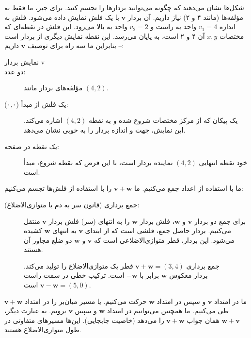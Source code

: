 \documentclass[12pt, a4paper]{book}
\begin{document}
	شکل‌ها نشان می‌دهند که چگونه می‌توانید بردارها را تجسم کنید. برای جبر، ما فقط به مؤلفه‌ها (مانند ۴ و ۲) نیاز داریم. آن بردار $\mathbf{v}$ با یک فلش نمایش داده می‌شود. فلش به اندازه $v_1 = 4$ واحد به راست و $v_2 = 2$ واحد به بالا می‌رود. این فلش در نقطه‌ای که مختصات $x, y$ آن ۴ و ۲ است، به پایان می‌رسد. این نقطه نمایش دیگری از بردار است -- بنابراین ما سه راه برای توصیف $\mathbf{v}$ داریم:
	\begin{description}
		\item[نمایش بردار v]
		\item[دو عدد:] مؤلفه‌های بردار مانند $(4,2)$.
		\item[یک فلش از مبدأ (۰,۰):] یک پیکان که از مرکز مختصات شروع شده و به نقطه $(4,2)$ اشاره می‌کند. این نمایش، جهت و اندازه بردار را به خوبی نشان می‌دهد.
		\item[یک نقطه در صفحه:] خود نقطه انتهایی $(4,2)$ نماینده بردار است، با این فرض که نقطه شروع، مبدأ است.
	\end{description}
	ما با استفاده از اعداد جمع می‌کنیم. ما $\mathbf{v} + \mathbf{w}$ را با استفاده از فلش‌ها تجسم می‌کنیم:
	\begin{description}
		\item[جمع برداری (قانون سر به دم یا متوازی‌الاضلاع):] برای جمع دو بردار $\mathbf{v}$ و $\mathbf{w}$، فلش بردار $\mathbf{w}$ را به انتهای (سر) فلش بردار $\mathbf{v}$ منتقل می‌کنیم. بردار حاصل جمع، فلشی است که از ابتدای $\mathbf{v}$ به انتهای $\mathbf{w}$ کشیده می‌شود. این بردار، قطر متوازی‌الاضلاعی است که $\mathbf{v}$ و $\mathbf{w}$ دو ضلع مجاور آن هستند.
	\end{description}
	
	\begin{figure}[h!]
		\centering
		\caption{جمع برداری $\mathbf{v} + \mathbf{w} = (3, 4)$ قطر یک متوازی‌الاضلاع را تولید می‌کند. بردار معکوس $\mathbf{w}$ برابر با $-\mathbf{w}$ است. ترکیب خطی در سمت راست $\mathbf{v} - \mathbf{w} = (5, 0)$ است.}
	\end{figure}
	
	ما در امتداد $\mathbf{v}$ و سپس در امتداد $\mathbf{w}$ حرکت می‌کنیم. یا مسیر میان‌بر را در امتداد $\mathbf{v} + \mathbf{w}$ طی می‌کنیم. ما همچنین می‌توانیم در امتداد $\mathbf{w}$ و سپس $\mathbf{v}$ برویم. به عبارت دیگر، $\mathbf{w} + \mathbf{v}$ همان جواب $\mathbf{v} + \mathbf{w}$ را می‌دهد (خاصیت جابجایی). این‌ها مسیرهای متفاوتی در طول متوازی‌الاضلاع هستند.
	
\end{document}
